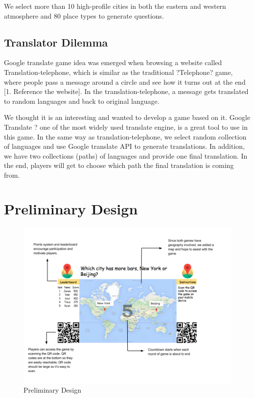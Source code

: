 \documentclass{sig-alternate}
\begin{document}
We select more than 10 high-profile cities in both the eastern and western atmosphere and 
80 place types to generate questions.

\subsection{Translator Dilemma}
Google translate game idea was emerged when browsing a website called 
Translation-telephone, which is similar as the traditional ?Telephone? game, 
 where people pass a message around a circle and see how it turns out at the end [1. Reference 
 the website]. In the translation-telephone, a message gets translated to random languages and 
 back to original language.

We thought it is an interesting and wanted to develop a game based on it. Google Translate ? one of the most widely used translate engine, is a great tool to use in this game. In the same way as translation-telephone, we select random collection of languages and use Google translate API to generate translations. In addition, we have two collections (paths) of languages and provide one final translation. In the end, players will get to choose which path the final translation is coming from.

\section{Preliminary Design}
\begin{figure}
	\includegraphics[width=\linewidth]{preliminary_design.png}
	\caption{Preliminary Design}
	\label{fig:predesign}
\end{figure}
\end{document}
